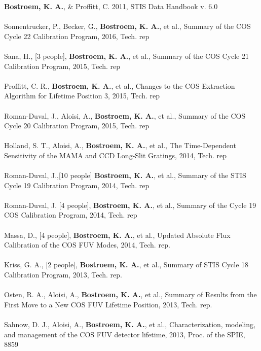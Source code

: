 \documentclass[10pt]{cv}
\begin{document}
\begin{llist}
{\bf Bostroem, K. A.}, \& Proffitt, C. 2011, STIS Data Handbook v. 6.0\\
\\
Sonnentrucker, P., Becker, G., {\bf Bostroem, K. A.}, et al., Summary of the COS Cycle 22 Calibration Program, 2016, Tech. rep \\ %
\\
Sana, H., [3 people], {\bf Bostroem, K. A.}, et al., Summary of the COS Cycle 21 Calibration Program, 2015, Tech. rep \\ %
\\
Proffitt, C. R., {\bf Bostroem, K. A.}, et al., Changes to the COS Extraction Algorithm for Lifetime Position 3, 2015, Tech. rep \\ %
\\
Roman-Duval, J., Aloisi, A., {\bf Bostroem, K. A.}, et al., Summary of the COS Cycle 20 Calibration Program, 2015, Tech. rep \\ %
\\
Holland, S. T., Aloisi, A., {\bf Bostroem, K. A.}, et al., The Time-Dependent Sensitivity of the MAMA and CCD Long-Slit Gratings, 2014, Tech. rep \\ %
\\
Roman-Duval, J.,[10 people] {\bf Bostroem, K. A.}, et al., Summary of the STIS Cycle 19 Calibration Program, 2014, Tech. rep \\ %
\\
Roman-Duval, J. [4 people], {\bf Bostroem, K. A.}, et al., Summary of the Cycle 19 COS Calibration Program, 2014, Tech. rep \\ %
\\
Massa, D., [4 people], \textbf{Bostroem, K. A.}, et al., Updated Absolute Flux Calibration of the COS FUV Modes, 2014, Tech. rep. \\ %
\\
Kriss, G. A., [2 people], \textbf{Bostroem, K. A.}, et al., Summary of STIS Cycle 18 Calibration Program, 2013, Tech. rep. \\ %
\\
Osten, R. A., Aloisi, A., \textbf{Bostroem, K. A.}, et al., Summary of Results from the First Move to a New COS FUV Lifetime Position, 2013, Tech. rep. \\ %
\\
Sahnow, D. J., Aloisi, A., \textbf{Bostroem, K. A.}, et al., Characterization, modeling, and management of the COS FUV detector lifetime, 2013, Proc. of the SPIE, 8859 \\
\\

\end{llist}
\end{document}
